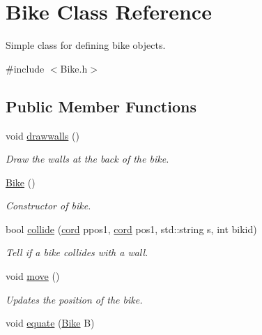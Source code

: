 \hypertarget{class_bike}{\section{Bike Class Reference}
\label{class_bike}
}


Simple class for defining bike objects.  




{\ttfamily \#include $<$Bike.\-h$>$}

\subsection*{Public Member Functions}
\begin{DoxyCompactItemize}
\item 
\hypertarget{class_bike_a4ea5dcdd17d53ea982d693b890b08380}{void \hyperlink{class_bike_a4ea5dcdd17d53ea982d693b890b08380}{drawwalls} ()}\label{class_bike_a4ea5dcdd17d53ea982d693b890b08380}

\begin{DoxyCompactList}\small\item\em Draw the walls at the back of the bike. \end{DoxyCompactList}\item 
\hypertarget{class_bike_a0ae353aaf9b269166b2c9d617d4261c9}{\hyperlink{class_bike_a0ae353aaf9b269166b2c9d617d4261c9}{Bike} ()}\label{class_bike_a0ae353aaf9b269166b2c9d617d4261c9}

\begin{DoxyCompactList}\small\item\em Constructor of bike. \end{DoxyCompactList}\item 
\hypertarget{class_bike_a15fe906332d5407e78d195a1763af5ad}{bool \hyperlink{class_bike_a15fe906332d5407e78d195a1763af5ad}{collide} (\hyperlink{classcord}{cord} ppos1, \hyperlink{classcord}{cord} pos1, std\-::string s, int bikid)}\label{class_bike_a15fe906332d5407e78d195a1763af5ad}

\begin{DoxyCompactList}\small\item\em Tell if a bike collides with a wall. \end{DoxyCompactList}\item 
\hypertarget{class_bike_a96d3e3515257ab50079c39d2f3bf29d8}{void \hyperlink{class_bike_a96d3e3515257ab50079c39d2f3bf29d8}{move} ()}\label{class_bike_a96d3e3515257ab50079c39d2f3bf29d8}

\begin{DoxyCompactList}\small\item\em Updates the position of the bike. \end{DoxyCompactList}\item 
\hypertarget{class_bike_a2d5ecf38ba57d63ffd37fae578e21008}{void \hyperlink{class_bike_a2d5ecf38ba57d63ffd37fae578e21008}{equate} (\hyperlink{class_bike}{Bike} B)}\label{class_bike_a2d5ecf38ba57d63ffd37fae578e21008}


\end{DoxyCompactItemize}
